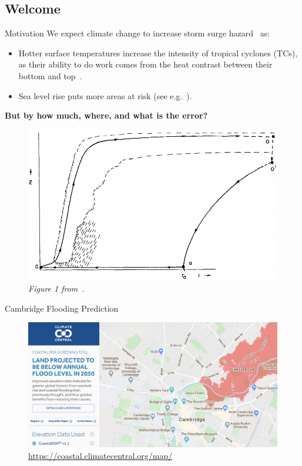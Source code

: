 \subsection{Welcome}
\begin{frame}{Motivation}
\vspace{-10pt}
We expect climate change to increase storm surge hazard~\cite{SROCC} as:\\
\begin{itemize}
\item Hotter surface temperatures increase the intensity of tropical cyclones (TCs),
      as their ability to do work comes from the heat contrast between their
      bottom and top~\cite{emanuel1991theory}.
 \item Sea level rise puts more areas at risk (see e.g.~\cite{kulp2019new}).
 \end{itemize}
\textbf{But by how much, where, and what is the error?}
\begin{figure}
\centering
    \includegraphics[width=0.49\linewidth]{images/hurricane-carnot.png}\\
    \textit{Figure 1 from~\cite{emanuel1991theory}. }
\end{figure}
\end{frame}

\begin{frame}{Cambridge Flooding Prediction~\cite{kulp2019new, kulp2018coastaldem}}
\vspace{-30pt}
\begin{figure}[htb!]
    \centering
    \hspace{-20pt}
    \includegraphics[width=0.9\paperwidth]{images/example-images/cambridge-surge.png}
    \vspace{-7pt}
    \caption{\url{https://coastal.climatecentral.org/map/}}
    \label{fig:}
\end{figure}
\end{frame}

